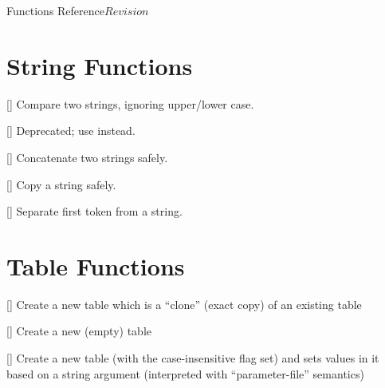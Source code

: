 \begin{cactuspart}{ Functions Reference}{}{$Revision$}
\begin{Lentry}

\end{Lentry}


\section{String Functions}

\begin{Lentry}

\item[\code{Util\_StrCmpi}]
     [\pageref{Util-StrCmpi}]
Compare two strings, ignoring upper/lower case.

\item[\code{Util\_Strdup}]
     [\pageref{Util-Strdup}]
Deprecated; use  instead.

\item[\code{Util\_Strlcat}]
     [\pageref{Util-Strlcat}]
Concatenate two strings safely.

\item[\code{Util\_Strlcpy}]
     [\pageref{Util-Strlcpy}]
Copy a string safely.

\item[\code{Util\_StrSep}]
     [\pageref{Util-StrSep}]
Separate first token from a string.

\end{Lentry}


\section{Table Functions}

\begin{Lentry}

\item[\code{Util\_TableClone}]
     [\pageref{Util-TableClone}]
Create a new table which is a ``clone'' (exact copy) of an existing
table

\item[\code{Util\_TableCreate}]
     [\pageref{Util-TableCreate}]
Create a new (empty) table

\item[\code{Util\_TableCreateFromString}]
     [\pageref{Util-TableCreateFromString}]
Create a new table (with the case-insensitive flag set) and sets
values in it based on a string argument (interpreted with
``parameter-file'' semantics)


\end{Lentry}
\end{cactuspart}
